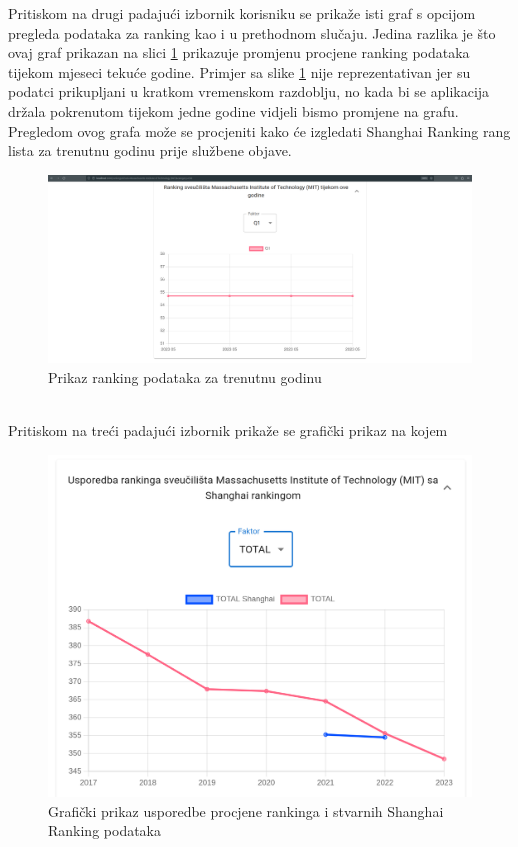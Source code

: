 \documentclass[times, utf8, zavrsni]{fer}
\begin{document}
\FloatBarrier 
Pritiskom na drugi padajući izbornik korisniku se prikaže isti graf s opcijom pregleda podataka za ranking
kao i u prethodnom slučaju. Jedina razlika je što ovaj graf prikazan na slici \ref{fig:uni3}
prikazuje promjenu procjene ranking podataka tijekom mjeseci tekuće godine. Primjer sa slike \ref{fig:uni3} nije reprezentativan jer su podatci 
prikupljani u kratkom vremenskom razdoblju, no kada bi se aplikacija držala pokrenutom tijekom jedne godine vidjeli bismo promjene na grafu. Pregledom ovog 
grafa može se procjeniti kako će izgledati Shanghai Ranking rang lista za trenutnu godinu prije službene objave. 
\begin{figure}[htb]
    \hspace*{-2cm}  
       \includegraphics[scale=0.21]{uni3.png} 
       \caption{Prikaz ranking podataka za trenutnu godinu}
       \label{fig:uni3}
       \end{figure} 
\\Pritiskom na treći padajući izbornik prikaže se grafički prikaz na kojem 
\begin{figure}[htb]
    \hspace*{-2cm}  
       \includegraphics[scale=0.35]{uni4.png} 
       \caption{Grafički prikaz usporedbe procjene rankinga i stvarnih Shanghai Ranking podataka}
       \label{fig:uni4}
       \end{figure} 
\end{document}
